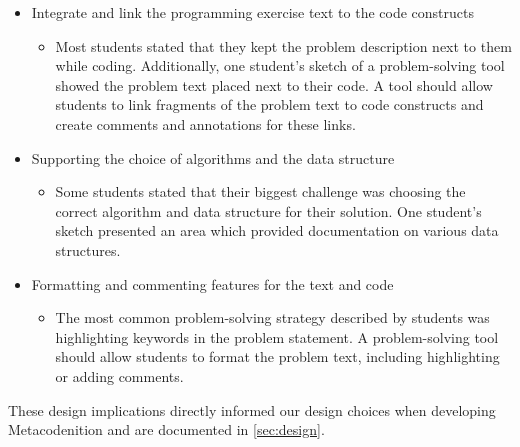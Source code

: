 \documentclass[sigconf,anonymous]{acmart}
\begin{document}
\begin{itemize}
    \item Integrate and link the programming exercise text to the code constructs
    \begin{itemize}
    \item
        Most students stated that they kept the problem description next to them while coding. Additionally, one student's sketch of a problem-solving tool showed the problem text placed next to their code. A tool should allow students to link fragments of the problem text to code constructs and create comments and annotations for these links.
    \end{itemize}
    \item Supporting the choice of algorithms and the data structure
    \begin{itemize}
    \item
        Some students stated that their biggest challenge was choosing the correct algorithm and data structure for their solution. One student's sketch presented an area which provided documentation on various data structures.
    \end{itemize}
    \item Formatting and commenting features for the text and code
    \begin{itemize}
    \item
       The most common problem-solving strategy described by students was highlighting keywords in the problem statement. A problem-solving tool should allow students to format the problem text, including highlighting or adding comments.
    \end{itemize}
\end{itemize}
These design implications directly informed our design choices when developing Metacodenition and are documented in \autoref{sec:design}.
\end{document}
